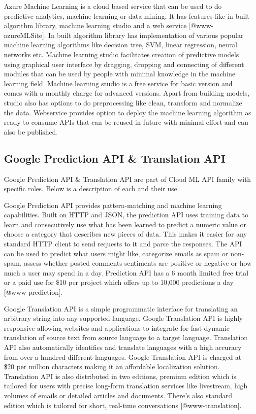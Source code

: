 Azure Machine Learning is a cloud based service that can be used to do
predictive analytics, machine learning or data mining. It has features
like in-built algorithm library, machine learning studio and a web
service [@www-azureMLSite]. In built algorithm library has
implementation of various popular machine learning algorithms like
decision tree, SVM, linear regression, neural networks etc. Machine
learning studio facilitates creation of predictive models using
graphical user interface by dragging, dropping and connecting of
different modules that can be used by people with minimal knowledge in
the machine learning field. Machine learning studio is a free service
for basic version and comes with a monthly charge for advanced
versions. Apart from building models, studio also has options to do
preprocessing like clean, transform and normalize the data. Webservice
provides option to deploy the machine learning algorithm as ready to
consume APIs that can be reused in future with minimal effort and can
also be published.
    
\subsection{Google Prediction API \& Translation API}

Google Prediction API \& Translation API are part of Cloud ML API
family with specific roles. Below is a description of each and their
use.

Google Prediction API provides pattern-matching and machine learning
capabilities. Built on HTTP and JSON, the prediction API uses training
data to learn and consecutively use what has been learned to predict a
numeric value or choose a category that describes new pieces of
data. This makes it easier for any standard HTTP client to send
requests to it and parse the responses. The API can be used to predict
what users might like, categorize emails as spam or non-spam, assess
whether posted comments sentiments are positive or negative or how
much a user may spend in a day. Prediction API has a 6 month limited
free trial or a paid use for \$10 per project which offers up to
10,000 predictions a day [@www-prediction].

Google Translation API is a simple programmatic interface for
translating an arbitrary string into any supported language. Google
Translation API is highly responsive allowing websites and
applications to integrate for fast dynamic translation of source text
from source language to a target language. Translation API also
automatically identifies and translate languages with a high accuracy
from over a hundred different languages.  Google Translation API is
charged at \$20 per million characters making it an affordable
localization solution. Translation API is also distributed in two
editions, premium edition which is tailored for users with precise
long-form translation services like livestream, high volumes of emails
or detailed articles and documents. There's also standard edition
which is tailored for short, real-time conversations
[@www-translation].

